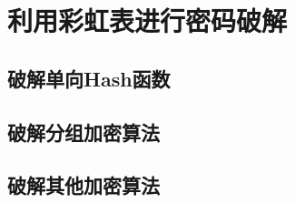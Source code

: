 \chapter{利用彩虹表进行密码破解}
\section{破解单向Hash函数}
	\subsection{}
	\subsection{}
	\subsection{}
	\subsection{}
\section{破解分组加密算法}
\section{破解其他加密算法}
